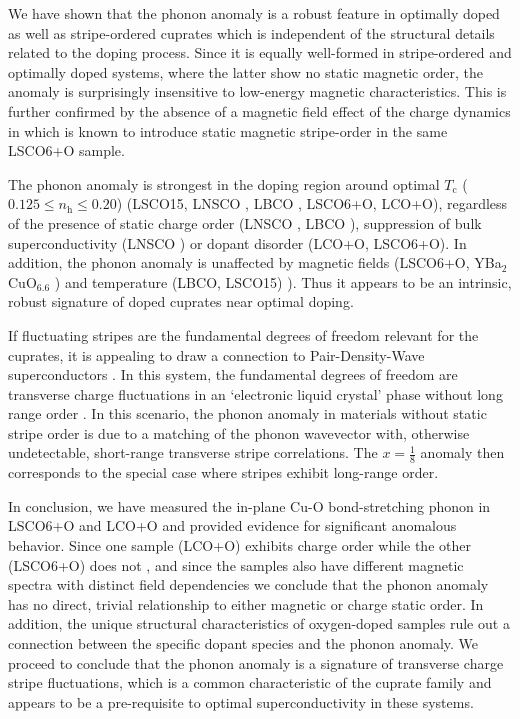 We have shown that the phonon anomaly is a robust feature in optimally doped  as well as stripe-ordered cuprates which is independent of the structural details related to the doping process. Since it is equally well-formed in stripe-ordered and optimally doped systems, where the latter show no static magnetic order, the anomaly is surprisingly insensitive to low-energy magnetic characteristics. This is further confirmed by the absence of a magnetic field effect of the charge dynamics in  which is known to introduce static magnetic stripe-order in the same LSCO6+O sample.

The phonon anomaly is strongest in the doping region around optimal $T_\text{c}$ ($0.125 \le n_\text{h} \le 0.20$) (LSCO15, LNSCO \cite{Reznik2007}, LBCO \cite{Reznik2006}, LSCO6+O, LCO+O), regardless of the presence of static charge order (LNSCO \cite{Tranquada1995}, LBCO \cite{Fujita2004}), suppression of bulk superconductivity (LNSCO \cite{Tranquada1996}) or dopant disorder (LCO+O, LSCO6+O). In addition, the phonon anomaly is unaffected by magnetic fields (LSCO6+O, YBa$_2$CuO$_{6.6}$ \cite{Reznik2016}) and temperature (LBCO, LSCO15) \cite{Reznik2007}). Thus it appears to be an intrinsic, robust signature of doped cuprates near optimal doping.

If fluctuating stripes are the fundamental degrees of freedom relevant for the cuprates, it is appealing to draw a connection to Pair-Density-Wave superconductors \cite{Fradkin2015}. In this system, the fundamental degrees of freedom are transverse charge fluctuations in an `electronic liquid crystal' phase without long range order \cite{Kivelson1998}. In this scenario, the phonon anomaly in materials without static stripe order is due to a matching of the phonon wavevector with, otherwise undetectable, short-range transverse stripe correlations. The $x=\frac{1}{8}$ anomaly then corresponds to the special case where stripes exhibit long-range order. 

In conclusion, we have measured the in-plane Cu-O bond-stretching phonon in LSCO6+O and LCO+O and provided evidence for significant anomalous behavior. Since one sample (LCO+O) exhibits charge order \cite{Zhang2018} while the other (LSCO6+O) does not \cite{Holm2019}, and since the samples also have different magnetic spectra with distinct field dependencies \cite{Jacobsen2018, Holm2019} we conclude that the phonon anomaly has no direct, trivial relationship to either magnetic or charge static order. In addition, the unique structural characteristics of oxygen-doped samples rule out a connection between the specific dopant species and the phonon anomaly. We proceed to conclude that the phonon anomaly is a signature of transverse charge stripe fluctuations, which is a common characteristic of the cuprate family and appears to be a pre-requisite to optimal superconductivity in these systems.

